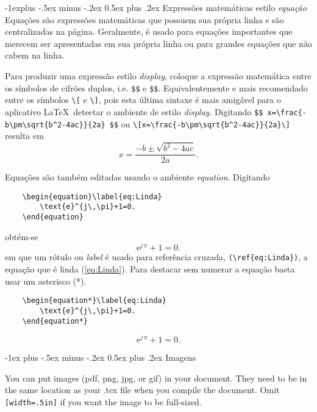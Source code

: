 \documentclass[10pt]{article}
\makeatletter
\renewcommand{\section}{\@startsection{section}{1}{0mm}%
                                {-1ex plus -.5ex minus -.2ex}%
                                {0.5ex plus .2ex}%
                                {\normalfont\large\bfseries}}
\renewcommand{\subsection}{\@startsection{subsection}{2}{0mm}%
                                {-1explus -.5ex minus -.2ex}%
                                {0.5ex plus .2ex}%
                                {\normalfont\normalsize\bfseries}}
\makeatother
\begin{document}
\begin{multicols}{1}
\subsection{Expressões matemáticas estilo \emph{equação}}
Equações são expressões matemáticas que possuem sua própria linha e são centralizadas na página. Geralmente,  é usado para equações importantes que merecem ser apresentadas em sua própria linha ou para grandes equações que não cabem na linha. 

Para produzir uma  expressão estilo \emph{display}, coloque a expressão matemática entre os símbolos de cifrões duplos, i.e. \verb|$$| e \verb|$$|. Equivalentemente e mais recomendado entre os símbolos \verb|\[| e \verb|\]|, pois esta última sintaxe é mais amigável para o aplicativo \LaTeX\, detectar o ambiente de estilo \emph{display}. Digitando  \verb|$$ x=\frac{-b\pm\sqrt{b^2-4ac}}{2a} $$| ou \verb|\[x=\frac{-b\pm\sqrt{b^2-4ac}}{2a}\]| resulta em  \[x=\frac{-b\pm\sqrt{b^2-4ac}}{2a}.\]
 
Equações são também editadas usando o ambiente \emph{equation}. Digitando
\begin{verbatim}
	\begin{equation}\label{eq:Linda}
		\text{e}^{j\,\pi}+1=0.
	\end{equation}
\end{verbatim}
obtém-se 
	\begin{equation}\label{eq:Linda}
		\text{e}^{j\,\pi}+1=0.
	\end{equation}
em que um rótulo ou \emph{label} é usado para referência cruzada, \verb|(\ref{eq:Linda})|, a equação que é linda (\ref{eq:Linda}). 
Para destacar sem numerar a equação basta usar um asterisco (*).
\begin{verbatim}
	\begin{equation*}\label{eq:Linda}
		\text{e}^{j\,\pi}+1=0.
	\end{equation*}
\end{verbatim}
	\begin{equation*}\label{eq:Linda}
	\text{e}^{j\,\pi}+1=0.
\end{equation*}


\section{Imagens}

You can put images (pdf, png, jpg, or gif) in your document. They need to be in the same location as your .tex file when you compile the document. Omit   \verb![width=.5in]! if you want the image to be full-sized.


\end{multicols}
\end{document}
